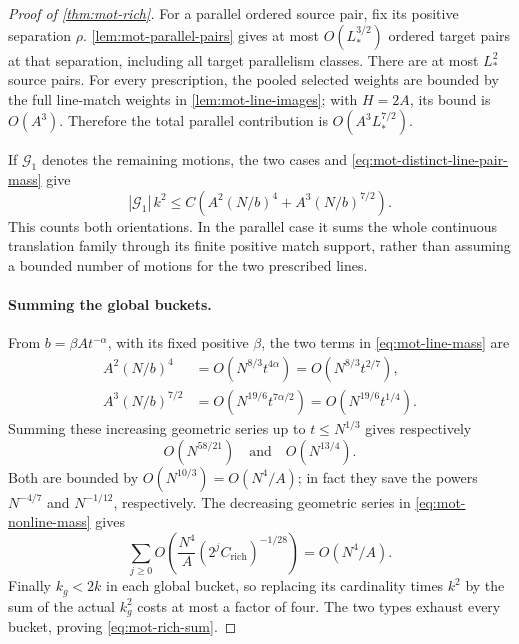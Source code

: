 \begin{proof}[Proof of \cref{thm:mot-rich}]
For a parallel ordered source pair, fix its positive separation $\rho$.  \cref{lem:mot-parallel-pairs} gives at most $O(L_*^{3/2})$ ordered target pairs at that separation, including all target parallelism classes.  There are at most $L_*^2$ source pairs.  For every prescription, the pooled selected weights are bounded by the full line-match weights in \cref{lem:mot-line-images}; with $H=2A$, its bound is $O(A^3)$.  Therefore the total parallel contribution is $O(A^3L_*^{7/2})$.

If $\mathcal{G}_1$ denotes the remaining motions, the two cases and \eqref{eq:mot-distinct-line-pair-mass} give
\begin{equation}
\label{eq:mot-line-mass}
 |\mathcal{G}_1|\,k^2
 \le C\left(A^2(N/b)^4+A^3(N/b)^{7/2}\right).
\end{equation}
This counts both orientations.  In the parallel case it sums the whole continuous translation family through its finite positive match support, rather than assuming a bounded number of motions for the two prescribed lines.

\paragraph{Summing the global buckets.}
From $b=\beta A t^{-\alpha}$, with its fixed positive $\beta$, the two terms in \eqref{eq:mot-line-mass} are
\begin{align}
\label{eq:mot-nonparallel-exponent}
 A^2(N/b)^4&=O\left(N^{8/3}t^{4\alpha}\right)
             =O\left(N^{8/3}t^{2/7}\right),\\
\label{eq:mot-parallel-exponent}
 A^3(N/b)^{7/2}&=O\left(N^{19/6}t^{7\alpha/2}\right)
             =O\left(N^{19/6}t^{1/4}\right).
\end{align}
Summing these increasing geometric series up to $t\le N^{1/3}$ gives respectively
\[
 O\left(N^{58/21}\right)
 \quad\text{and}\quad
 O\left(N^{13/4}\right).
\]
Both are bounded by $O(N^{10/3})=O(N^4/A)$; in fact they save the powers $N^{-4/7}$ and $N^{-1/12}$, respectively. The decreasing geometric series in \eqref{eq:mot-nonline-mass} gives
\[
 \sum_{j\ge0}
 O\left(\frac{N^4}{A}
       (2^jC_{\mathrm{rich}})^{-1/28}\right)
 =O(N^4/A).
\]
Finally $k_g<2k$ in each global bucket, so replacing its cardinality times $k^2$ by the sum of the actual $k_g^2$ costs at most a factor of four.  The two types exhaust every bucket, proving \eqref{eq:mot-rich-sum}.
\end{proof}

